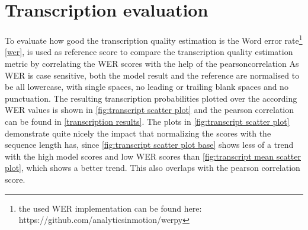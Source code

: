 \section{Transcription evaluation}
To evaluate how good the transcription quality estimation is the Word error rate\footnote{the used WER implementation can be found here: https://github.com/analyticsinmotion/werpy} \autoref{wer}, is used as reference score to compare the transcription quality estimation metric by correlating the WER scores with the help of the pearsoncorrelation \cite{2020SciPy-NMeth}
As WER is case sensitive, both the model result and the reference are normalised to be all lowercase, with single spaces, no leading or trailing blank spaces and no punctuation.
The resulting transcription probabilities plotted over the according WER values is shown in \autoref{fig:transcript scatter plot} and the pearson correlation can be found in \autoref{transcription results}. 
The plots in \autoref{fig:transcript scatter plot} demonstrate quite nicely the impact that normalizing the scores with the sequence length has, since \autoref{fig:transcript scatter plot base} shows less of a trend with the high model scores and low WER scores than \autoref{fig:transcript mean scatter plot}, which shows a better trend. This also overlaps with the pearson correlation score. 
